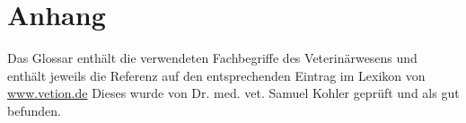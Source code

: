 

\chapter{Anhang}


	
		
\label{Glossar}

Das Glossar enthält die verwendeten Fachbegriffe des Veterinärwesens und enthält jeweils die Referenz auf den entsprechenden Eintrag im Lexikon von \newline \url{www.vetion.de} \citep{GmbH2009} Dieses wurde von Dr. med. vet. Samuel Kohler geprüft und als gut befunden. 
\glsaddall
\printglossary

	

